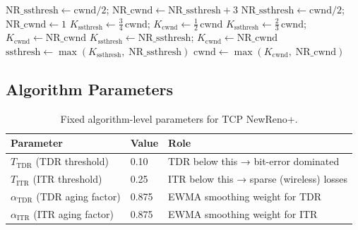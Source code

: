 \documentclass[12pt,a4paper]{article}
\begin{document}
\begin{algorithm}[H]
\caption{Slowdown Action (NewReno+) — three-level window decision}
\begin{algorithmic}[1]
  \State $\text{NR\_ssthresh} \gets \text{cwnd}/2$;
         \quad $\text{NR\_cwnd} \gets \text{NR\_ssthresh} + 3$
  \State $\text{NR\_ssthresh} \gets \text{cwnd}/2$;
         \quad $\text{NR\_cwnd} \gets 1$
\EndIf
{}
  \State $K_\text{ssthresh} \gets \tfrac{3}{4}\,\text{cwnd}$;
         \quad $K_\text{cwnd} \gets \tfrac{1}{2}\,\text{cwnd}$
  \State $K_\text{ssthresh} \gets \tfrac{2}{3}\,\text{cwnd}$;
         \quad $K_\text{cwnd} \gets \text{NR\_cwnd}$
\Else
  \State $K_\text{ssthresh} \gets \text{NR\_ssthresh}$;
         \quad $K_\text{cwnd} \gets \text{NR\_cwnd}$
\EndIf
\State $\text{ssthresh} \gets \max(K_\text{ssthresh},\;\text{NR\_ssthresh})$
\State $\text{cwnd}     \gets \max(K_\text{cwnd},\;\text{NR\_cwnd})$
\end{algorithmic}
\end{algorithm}

\subsection{Algorithm Parameters}

\begin{table}[H]
\centering
\renewcommand{\arraystretch}{1.3}
\begin{tabular}{@{}llp{8cm}@{}}
\toprule
\textbf{Parameter} & \textbf{Value} & \textbf{Role} \\
\midrule
$T_\text{TDR}$ (TDR threshold)         & 0.10  & TDR below this → bit-error dominated \\
$T_\text{ITR}$ (ITR threshold)         & 0.25  & ITR below this → sparse (wireless) losses \\
$\alpha_\text{TDR}$ (TDR aging factor) & 0.875 & EWMA smoothing weight for TDR \\
$\alpha_\text{ITR}$ (ITR aging factor) & 0.875 & EWMA smoothing weight for ITR \\
\bottomrule
\end{tabular}
\caption{Fixed algorithm-level parameters for TCP NewReno+.}
\end{table}
\end{document}
